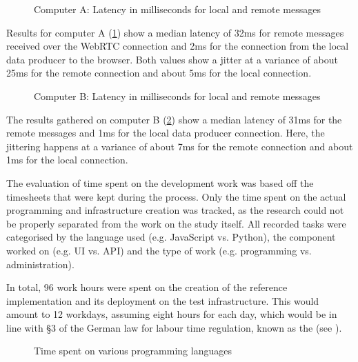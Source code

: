 \begin{figure}[h]
\centering

\caption[Message latency on Computer A]{Computer A: Latency in milliseconds for local and remote messages\protect}
\label{fig:latencyComputerA}
\end{figure}

Results for computer A (\ref{fig:latencyComputerA}) show a median latency of 32ms for remote messages received over the WebRTC connection and 2ms for the connection from the local data producer to the browser.
Both values show a jitter at a variance of about 25ms for the remote connection and about 5ms for the local connection.

\begin{figure}[h]
\centering

\caption[Message latency on Computer B]{Computer B: Latency in milliseconds for local and remote messages\protect}
\label{fig:latencyComputerB}
\end{figure}

The results gathered on computer B (\ref{fig:latencyComputerB}) show a median latency of 31ms for the remote messages and 1ms for the local data producer connection.
Here, the jittering happens at a variance of about 7ms for the remote connection and about 1ms for the local connection.

The evaluation of time spent on the development work was based off the timesheets that were kept during the process. Only the time spent on the actual programming and infrastructure creation was tracked, as the research could not be properly separated from the work on the study itself. All recorded tasks were categorised by the language used (e.g. JavaScript vs. Python), the component worked on (e.g. \ac{UI} vs. \ac{API}) and the type of work (e.g. programming vs. administration).

In total, 96 work hours were spent on the creation of the reference implementation and its deployment on the test infrastructure. This would amount to 12 workdays, assuming eight hours for each day, which would be in line with §3 of the German law for labour time regulation, known as the  (see \parencite{abzgPar3}).

\begin{figure}[h]
\centering

\caption[Time spent on languages]{Time spent on various programming languages\protect}
\label{fig:timeSpentLanguages}
\end{figure}

